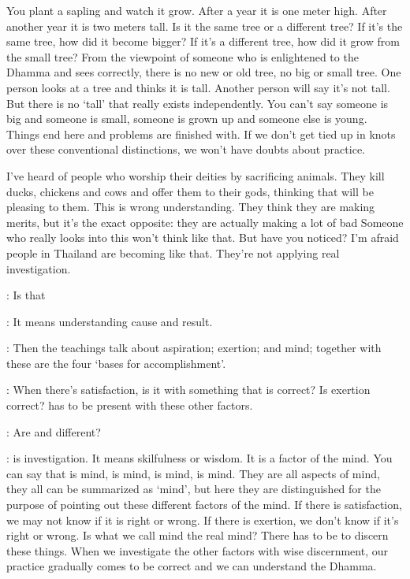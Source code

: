 You plant a sapling and watch it grow. After a year it is one meter high. After another year it is two meters tall. Is it the same tree or a different tree? If it's the same tree, how did it become bigger? If it's a different tree, how did it grow from the small tree? From the viewpoint of someone who is enlightened to the Dhamma and sees correctly, there is no new or old tree, no big or small tree. One person looks at a tree and thinks it is tall. Another person will say it's not tall. But there is no `tall' that really exists independently. You can't say someone is big and someone is small, someone is grown up and someone else is young. Things end here and problems are finished with. If we don't get tied up in knots over these conventional distinctions, we won't have doubts about practice.

I've heard of people who worship their deities by sacrificing animals. They kill ducks, chickens and cows and offer them to their gods, thinking that will be pleasing to them. This is wrong understanding. They think they are making merits, but it's the exact opposite: they are actually making a lot of bad  Someone who really looks into this won't think like that. But have you noticed? I'm afraid people in Thailand are becoming like that. They're not applying real investigation.

: Is that 

: It means understanding cause and result.

: Then the teachings talk about  aspiration;  exertion; and  mind; together with  these are the four  `bases for accomplishment'.

: When there's satisfaction, is it with something that is correct? Is exertion correct?  has to be present with these other factors.

: Are  and  different?

:  is investigation. It means skilfulness or wisdom. It is a factor of the mind. You can say that  is mind,  is mind,  is mind,  is mind. They are all aspects of mind, they all can be summarized as `mind', but here they are distinguished for the purpose of pointing out these different factors of the mind. If there is satisfaction, we may not know if it is right or wrong. If there is exertion, we don't know if it's right or wrong. Is what we call mind the real mind? There has to be  to discern these things. When we investigate the other factors with wise discernment, our practice gradually comes to be correct and we can understand the Dhamma.

